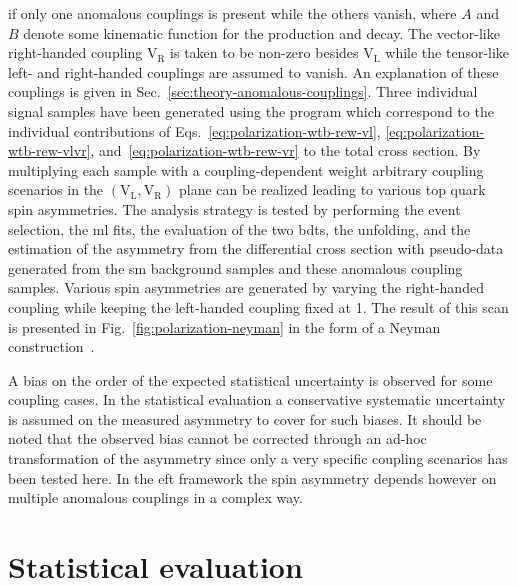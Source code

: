 if only one anomalous couplings is present while the others vanish, where $A$ and $B$ denote some kinematic function for the production and decay. The vector-like right-handed coupling $\mathrm{V}_\mathrm{R}$ is taken to be non-zero besides $\mathrm{V}_\mathrm{L}$ while the tensor-like left- and right-handed couplings are assumed to vanish. An explanation of these couplings is given in Sec.~\ref{sec:theory-anomalous-couplings}. Three individual signal samples have been generated using the \COMPHEP program which correspond to the individual contributions of Eqs.~\ref{eq:polarization-wtb-rew-vl}, \ref{eq:polarization-wtb-rew-vlvr}, and~\ref{eq:polarization-wtb-rew-vr} to the total cross section. By multiplying each sample with a coupling-dependent weight arbitrary coupling scenarios in the $(\mathrm{V}_\mathrm{L},\mathrm{V}_\mathrm{R})$ plane can be realized leading to various top quark spin asymmetries. The analysis strategy is tested by performing the event selection, the \gls{ml} fits, the evaluation of the two \glspl{bdt}, the unfolding, and the estimation of the asymmetry from the differential cross section with pseudo-data generated from the \gls{sm} background samples and these anomalous coupling samples. Various spin asymmetries are generated by varying the right-handed coupling while keeping the left-handed coupling fixed at 1. The result of this scan is presented in Fig.~\ref{fig:polarization-neyman} in the form of a Neyman construction~\cite{neyman1935}.



A bias on the order of the expected statistical uncertainty is observed for some coupling cases. In the statistical evaluation a conservative systematic uncertainty is assumed on the measured asymmetry to cover for such biases. It should be noted that the observed bias cannot be corrected through an ad-hoc transformation of the asymmetry since only a very specific coupling scenarios has been tested here. In the \gls{eft} framework the spin asymmetry depends however on multiple anomalous couplings in a complex way.


\section{Statistical evaluation}

